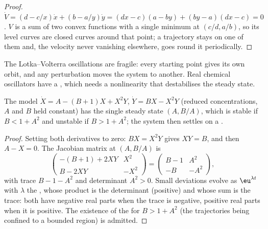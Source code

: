 \begin{proof}
$\dot V = (d - c/x)\dot x + (b - a/y)\dot y = (dx - c)(a - by) + (by - a)(dx - c) = 0$. $V$ is a
sum of two convex functions with a single minimum at $(c/d, a/b)$, so its level
curves are closed curves around that point; a trajectory stays on one of
them and, the velocity never vanishing elsewhere, goes round it periodically.
\end{proof}

The Lotka--Volterra oscillations are fragile: every starting point gives its
own orbit, and any perturbation moves the system to another. Real chemical
oscillators have a , which needs a nonlinearity that destabilises
the steady state.

\begin{proposition}\label{prop:b3:complex-kinetics:hopf}
The model $\dot X = A - (B + 1)X + X^2Y$, $\dot Y = BX - X^2Y$ (reduced concentrations,
$A$ and $B$ held constant) has the single steady state $(A, B/A)$, which is
stable if $B < 1 + A^2$ and unstable if $B > 1 + A^2$; the system then settles on a
.
\end{proposition}

\begin{proof}
Setting both derivatives to zero: $BX = X^2Y$ gives $XY = B$, and then $A - X = 0$. The
Jacobian matrix at $(A, B/A)$ is
\[
  \begin{pmatrix} -(B + 1) + 2XY & X^2 \\ B - 2XY & -X^2 \end{pmatrix}
  = \begin{pmatrix} B - 1 & A^2 \\ -B & -A^2 \end{pmatrix},
\]
with trace $B - 1 - A^2$ and determinant $A^2 > 0$. Small deviations evolve as
$\eu^{\lambda t}$ with $\lambda$ the , whose product is the determinant (positive)
and whose sum is the trace: both have negative real parts when the trace is
negative, positive real parts when it is positive. The existence of the  for $B > 1 + A^2$ (the trajectories being confined to a bounded region) is
admitted.
\end{proof}


